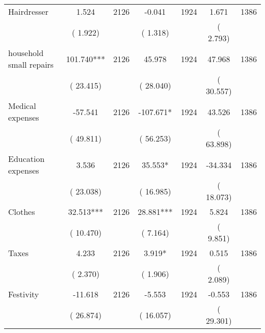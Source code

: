 \begin{tabular}{l*{6}{c}}
Hairdresser        &              1.524      &       2126       &             -0.041      &       1924       &              1.671      &       1386       \\
                       &       (       1.922)            &                               &       (       1.318)            &                               &       (       2.793)            &                               \\
household small repairs        &            101.740***      &       2126       &             45.978      &       1924       &             47.968      &       1386       \\
                       &       (      23.415)            &                               &       (      28.040)            &                               &       (      30.557)            &                               \\
Medical expenses        &            -57.541      &       2126       &           -107.671*      &       1924       &             43.526      &       1386       \\
                       &       (      49.811)            &                               &       (      56.253)            &                               &       (      63.898)            &                               \\
Education expenses        &              3.536      &       2126       &             35.553*      &       1924       &            -34.334      &       1386       \\
                       &       (      23.038)            &                               &       (      16.985)            &                               &       (      18.073)            &                               \\
Clothes        &             32.513***      &       2126       &             28.881***      &       1924       &              5.824      &       1386       \\
                       &       (      10.470)            &                               &       (       7.164)            &                               &       (       9.851)            &                               \\
Taxes        &              4.233      &       2126       &              3.919*      &       1924       &              0.515      &       1386       \\
                       &       (       2.370)            &                               &       (       1.906)            &                               &       (       2.089)            &                               \\
Festivity        &            -11.618      &       2126       &             -5.553      &       1924       &             -0.553      &       1386       \\
                       &       (      26.874)            &                               &       (      16.057)            &                               &       (      29.301)            &                               \\
\hline \end{tabular}